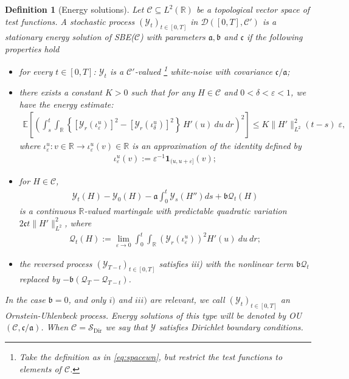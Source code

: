 \documentclass[a4paper, reqno, 12pt]{amsart}
\theoremstyle{plain}
\newtheorem{definition}{Definition}[section]
\theoremstyle{definition}
\newcommand{\R}{\mathbb{R}}
\newcommand{\Sdir}{\mathcal{S}_{\text{Dir}}}
\begin{document}
\begin{definition}[Energy solutions] \label{def:SBEenergysolutions} 
    Let $\mathcal{C}\subseteq L^2(\R)$ be a topological vector space of test functions. A stochastic process $(\mathcal{Y}_t)_{t\in[0,T]}$ in $\mathcal D([0,T],\mathcal C')$ is a stationary energy solution of SBE($\mathcal{C}$) with parameters $\mathfrak a, \mathfrak b$ and $\mathfrak c$ if the following properties hold
\begin{itemize}
    \item[i)] for every $t\in [0,T]$: $\mathcal{Y}_t$ is a $\mathcal{C}'$-valued {\footnote{Take the definition as in \eqref{eq:spacewn}, but restrict the test functions to elements of $\mathcal C$.}} white-noise with covariance $\mathfrak c/\mathfrak a$;
    \item[ii)] there exists a constant $K>0$ such that for any $H \in \mathcal{C}$ and $0<\delta<\varepsilon<1$, we have the energy estimate:
    \begin{align*}
        \mathbb{E}\left[ \left(\int_s^t\int_{\mathbb{R}} \left\{\left[\mathcal{Y}_r(\iota_{\varepsilon}^u)\right]^2 - \left[\mathcal{Y}_r(\iota_{\delta}^u)\right]^2\right\} \, H ' (u)\ du\ dr\right)^2 \right] \leq K \| H' \|^2_{L^2} (t-s) \; \varepsilon, 
    \end{align*}
    where $\iota^u_{\varepsilon}: v \in \R\to \iota^u_{\varepsilon} (v) \in  \mathbb{R}$ is an approximation of the identity defined by
    \begin{align}
    \label{eq:iota}
        \iota^u_{\varepsilon} (v) := \varepsilon^{-1}\mathbf{1}_{(u,u+\varepsilon]}(v);
    \end{align}
    \item[iii)] for $H\in\mathcal{C}$,
    \begin{align} 
    \label{eq:SBEmartingale}
        \mathcal{Y}_t(H) -\mathcal{Y}_0(H) -\mathfrak a\int_0^t \mathcal{Y}_s(H'') ds + \mathfrak b \mathcal{Q}_t(H)
    \end{align}
    is a continuous $\R$-valued martingale with predictable quadratic variation $2\mathfrak c t\| H'\|_{L^2}^2$, where 
    \begin{align}
    \label{eq:QSBE}
        \mathcal{Q}_t(H) := \lim_{\varepsilon\to 0}\int_0^t\int_{\mathbb{R}}\left(\mathcal{Y}_r(\iota_{\varepsilon}^u)\right)^2 H'(u)\ du\ dr;
    \end{align}
    \item[iv)]  the reversed process $(\mathcal{Y}_{T-t})_{t\in[0,T]}$ satisfies \textit{iii)} with the nonlinear term $\mathfrak b\mathcal Q_t$ replaced by $-\mathfrak b(\mathcal{Q}_T -\mathcal Q_{T-t})$.
\end{itemize}
\smallskip 

In the case $\mathfrak b=0$, and only $i)$ and $iii)$ are relevant, we call $(\mathcal{Y}_t)_{t\in[0,T]}$ an Ornstein-Uhlenbeck process. Energy solutions of this type will be denoted by OU$(\mathcal{C},\mathfrak c/\mathfrak a)$. When $\mathcal C = \Sdir$ we say that $\mathcal Y$ satisfies Dirichlet boundary conditions. 
\end{definition}
\end{document}
